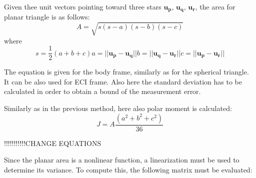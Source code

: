 \documentclass[12pt,a4paper,oneside]{article}
\begin{document}
Given thee unit vectors pointing toward three stars $\bm{u_p}$, $\bm{u_q}$, $\bm{u_r}$, the area for planar triangle is as follows:
\begin{equation}
A = \sqrt{s(s-a)(s-b)(s-c)}
\end{equation}
where
\begin{subequations}
\begin{equation}
s = \frac{1}{2}(a + b + c)
\end{equation}
\begin{equation}
a = ||\bm{u_p} - \bm{u_q}||
\end{equation}
\begin{equation}
b = ||\bm{u_q} - \bm{u_r}||
\end{equation}
\begin{equation}
c = ||\bm{u_p} - \bm{u_r}||
\end{equation}
\end{subequations}

The equation is given for the body frame, similarly as for the spherical triangle. It can be also used for ECI frame. Also here the standard deviation has to be calculated in order to obtain a bound of the measurement error.

Similarly as in the previous method, here also polar moment is calculated:
\begin{equation}
J = A\frac{(a^2 + b^2 + c^2)}{36}
\end{equation}



!!!!!!!!!!!CHANGE EQUATIONS




Since the planar area is a nonlinear function, a linearization must be used to determine its variance. To compute this, the following matrix must be evaluated:
\end{document}
